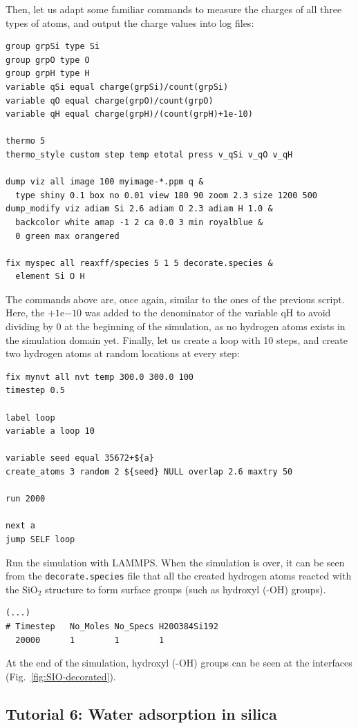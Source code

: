 \documentclass[9pt,tutorial]{livecoms}
\newcommand{\lmpcmd}[1]{\colorbox{listing}{\textcolor{command}{\small{#1}}}} %
\newcommand{\flecmd}[1]{\textcolor{command}{\texttt{#1}}} %
\begin{document}
Then, let us adapt some familiar commands to measure the charges of all three
types of atoms, and output the charge values into log files:
\begin{lstlisting}
group grpSi type Si
group grpO type O
group grpH type H
variable qSi equal charge(grpSi)/count(grpSi)
variable qO equal charge(grpO)/count(grpO)
variable qH equal charge(grpH)/(count(grpH)+1e-10)

thermo 5
thermo_style custom step temp etotal press v_qSi v_qO v_qH

dump viz all image 100 myimage-*.ppm q &
  type shiny 0.1 box no 0.01 view 180 90 zoom 2.3 size 1200 500
dump_modify viz adiam Si 2.6 adiam O 2.3 adiam H 1.0 &
  backcolor white amap -1 2 ca 0.0 3 min royalblue &
  0 green max orangered

fix myspec all reaxff/species 5 1 5 decorate.species &
  element Si O H
\end{lstlisting}
The commands above are, once again, similar to the ones of the previous script.
Here, the $+1 \mathrm{e}{-10}$ was added to the denominator of the \lmpcmd{variable qH}
to avoid dividing by 0 at the beginning of the simulation, as no hydrogen
atoms exists in the simulation domain yet.  Finally, let us
create a loop with 10 steps, and create two hydrogen atoms at random locations at
every step:
\begin{lstlisting}
fix mynvt all nvt temp 300.0 300.0 100
timestep 0.5

label loop
variable a loop 10

variable seed equal 35672+${a}
create_atoms 3 random 2 ${seed} NULL overlap 2.6 maxtry 50

run 2000

next a
jump SELF loop
\end{lstlisting}
Run the simulation with LAMMPS.  When the simulation is over,
it can be seen from the \flecmd{decorate.species} file that
all the created hydrogen atoms reacted with the $\text{SiO}_{2}$ structure to
form surface groups (such as hydroxyl (-OH) groups).
\begin{lstlisting}
(...)
# Timestep   No_Moles No_Specs H20O384Si192
  20000      1        1        1
\end{lstlisting}
At the end of the simulation, hydroxyl (-OH) groups can be seen at the interfaces
(Fig.~\ref{fig:SIO-decorated}).

\subsection{Tutorial 6: Water adsorption in silica}
\label{gcmc-silica-label}
\end{document}
